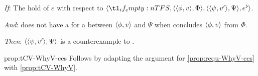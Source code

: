 \begin{note}
\begin{proposition}
    \begin{itenum}
    \item[\emph{If}:]
      The  hold of \(e\) with respect to \(\langle \vAgent{}, \pvp{\phi}{v}{\Phi}, \pvp{\psi}{v'}{\Psi}, e^{\flat} \rangle\).
    \item[\emph{And}:]
      \vAgent{} does not have a \wit{} for a \ros{} between \(\langle \phi, v \rangle\) and \(\Psi\) when \vAgent{} concludes \(\langle \phi, v \rangle\) from \(\Phi\).
    \item[\emph{Then}:]
      \(\langle \langle \psi, v' \rangle, \Psi \rangle\) is a counterexample to \issueConstraint{}.
    \end{itenum}
    \vspace{-\baselineskip}
  \end{proposition}

  \begin{argument}{prop:tCV-WhyV-ces}
    Follows by adapting the argument for \autoref{prop:requ-WhyV-ces} with \autoref{prop:tCV-WhyV}.
  \end{argument}
\end{note}







